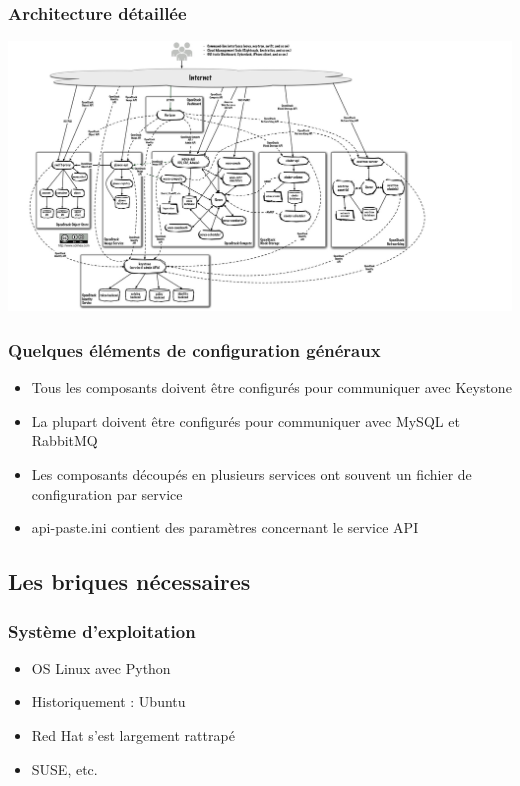   \begin{frame}
    \frametitle{Architecture détaillée}
    \begin{center}
      \includegraphics[width=\textwidth]{images/architecture.jpg}
    \end{center}
  \end{frame}

  \begin{frame}
    \frametitle{Quelques éléments de configuration généraux}
    \begin{itemize}
      \item Tous les composants doivent être configurés pour communiquer avec Keystone
      \item La plupart doivent être configurés pour communiquer avec MySQL et RabbitMQ
      \item Les composants découpés en plusieurs services ont souvent un fichier de configuration par service
      \item api-paste.ini contient des paramètres concernant le service API
    \end{itemize}
  \end{frame}

  \subsection[Les briques nécessaires]{Les briques nécessaires}
  \begin{frame}
    \frametitle{Système d'exploitation}
    \begin{itemize}
      \item OS Linux avec Python
      \item Historiquement : Ubuntu
      \item Red Hat s'est largement rattrapé
      \item SUSE, etc.
    \end{itemize}
  \end{frame}

